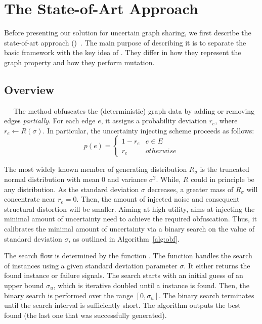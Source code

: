 \section{The State-of-Art Approach}
Before presenting our solution {\methodName} for uncertain graph sharing, we first describe the state-of-art approach ({\soaName})~\cite{Boldi_Injecting_2012}. 
The main purpose of describing it is to separate the basic framework with the key idea of {\methodName}. 
They differ in how they represent the graph property and how they perform mutation. 

\subsection{Overview}~~
The {\soaName} method obfuscates the (deterministic) graph data by adding or removing edges \emph{partially}. 
For each edge $e$, it assigns a probability deviation $r_{e}$, where $r_{e} \leftarrow R(\sigma)$. 
In particular, the uncertainty injecting scheme proceeds as follows:
\begin{equation}
	p(e) =
	\begin{cases}
		 1-r_{e}  & e \in E \\
		 r_{e}    & otherwise 
	\end{cases}
	\label{eq:inject}
\end{equation}

The most widely known member of generating distribution $R_{\sigma}$ is the truncated normal distribution with mean 0 and variance $\sigma^2$. 
While, $R$ could in principle be any distribution. 
As the standard deviation $\sigma$ decreases, a greater mass of $R_{\sigma}$ will concentrate near $r_{e}=0$.  
Then, the amount of injected noise and consequent structural distortion will be smaller. 
Aiming at high utility, {\soaName} aims at injecting the minimal amount of uncertainty need to achieve the required obfuscation. 
Thus, it calibrates the minimal amount of uncertainty via a binary search on the value of standard deviation $\sigma$, as outlined in Algorithm~\ref{alg:obf}.  


The search flow is determined by the function {\genobf}. The function {\genobf} handles the search of {\keobf} instances using a given standard deviation parameter $\sigma$. It either returns the found {\keobf} instance or failure signals.
The search starts with an initial guess of an upper bound $\sigma_{u}$, which is iterative doubled until a {\keobf} instance is found. Then, the binary search is performed over the range $[0,\sigma_{u}]$. The binary search terminates until the search interval is sufficiently short. The algorithm outputs the best {\keobf} found (the last one that was successfully generated).

